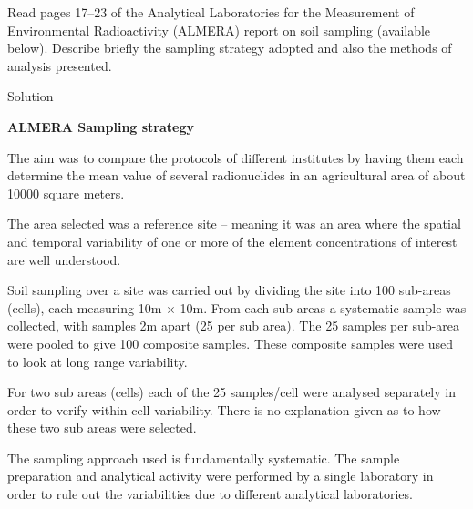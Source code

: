 \documentclass[
  letterpaper,
  DIV=11,
  numbers=noendperiod,
  oneside]{scrartcl}
\begin{document}
\begin{tcolorbox}[enhanced jigsaw, bottomrule=.15mm, breakable, bottomtitle=1mm, colback=white, titlerule=0mm, colbacktitle=quarto-callout-tip-color!10!white, rightrule=.15mm, toptitle=1mm, left=2mm, opacityback=0, toprule=.15mm, arc=.35mm, title={Task 11}, colframe=quarto-callout-tip-color-frame, coltitle=black, leftrule=.75mm, opacitybacktitle=0.6]

Read pages 17--23 of the Analytical Laboratories for the Measurement of
Environmental Radioactivity (ALMERA) report on soil sampling (available
below). Describe briefly the sampling strategy adopted and also the
methods of analysis presented.

Solution

\textbf{ALMERA Sampling strategy}

The aim was to compare the protocols of different institutes by having
them each determine the mean value of several radionuclides in an
agricultural area of about 10000 square meters.

The area selected was a reference site -- meaning it was an area where
the spatial and temporal variability of one or more of the element
concentrations of interest are well understood.

Soil sampling over a site was carried out by dividing the site into 100
sub-areas (cells), each measuring 10m \(\times\) 10m. From each sub
areas a systematic sample was collected, with samples 2m apart (25 per
sub area). The 25 samples per sub-area were pooled to give 100 composite
samples. These composite samples were used to look at long range
variability.

For two sub areas (cells) each of the 25 samples/cell were analysed
separately in order to verify within cell variability. There is no
explanation given as to how these two sub areas were selected.

The sampling approach used is fundamentally systematic. The sample
preparation and analytical activity were performed by a single
laboratory in order to rule out the variabilities due to different
analytical laboratories.

\end{tcolorbox}
\end{document}
